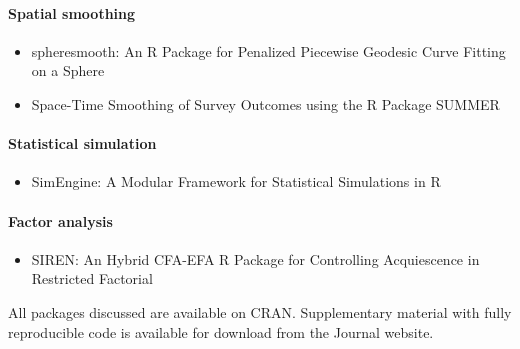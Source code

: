 \paragraph{Spatial smoothing}\label{spatial-smoothing}

\begin{itemize}
\tightlist
\item
  spheresmooth: An R Package for Penalized Piecewise Geodesic Curve Fitting on a Sphere
\item
  Space-Time Smoothing of Survey Outcomes using the R Package SUMMER
\end{itemize}

\paragraph{Statistical simulation}\label{statistical-simulation}

\begin{itemize}
\tightlist
\item
  SimEngine: A Modular Framework for Statistical Simulations in R
\end{itemize}

\paragraph{Factor analysis}\label{factor-analysis}

\begin{itemize}
\tightlist
\item
  SIREN: An Hybrid CFA-EFA R Package for Controlling Acquiescence in Restricted Factorial
\end{itemize}

All packages discussed are available on CRAN. Supplementary material with fully reproducible code is available for download from the Journal website.


\address{%
Rob J Hyndman\\
Monash University\\%
\\
%
\url{https://journal.r-project.org}\\%
%
\href{mailto:r-journal@r-project.org}{\nolinkurl{r-journal@r-project.org}}%
}
